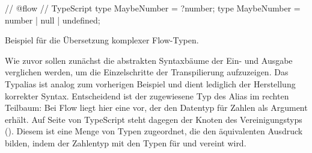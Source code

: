 \bigbreak
\begin{listing}[htb]
\begin{textcode}
// @flow                               // TypeScript
type MaybeNumber = ?number;           type MaybeNumber = number | null | undefined;
\end{textcode}
\listingvspace
\caption{Beispiel für die Übersetzung komplexer Flow-Typen.}
\label{code:example-complex}
\end{listing}

Wie zuvor sollen zunächst die abstrakten Syntaxbäume der Ein- und Ausgabe verglichen werden, um die Einzelschritte der Transpilierung aufzuzeigen. Das Typalias ist analog zum vorherigen Beispiel und dient lediglich der Herstellung korrekter Syntax. Entscheidend ist der zugewiesene Typ des Alias im rechten Teilbaum: Bei Flow liegt hier eine  vor, der den Datentyp für Zahlen als Argument erhält. Auf Seite von TypeScript steht dagegen der Knoten des Vereinigungstyps (). Diesem ist eine Menge von Typen zugeordnet, die den äquivalenten Ausdruck bilden, indem der Zahlentyp mit den Typen für  und  vereint wird.

